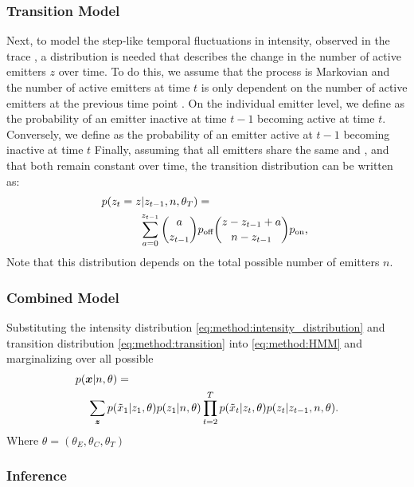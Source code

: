\subsubsection{Transition Model}
Next, to model the step-like temporal fluctuations in intensity, observed in the trace \trace, 
  a distribution is needed that describes the change in the number of active emitters $z$ over time. 
  To do this, we assume that the process is Markovian and the number of active emitters  
  at time $t$ is only dependent on the number of active emitters at the previous time point .
  On the individual emitter level, we define \pon as the probability of an emitter inactive at time $t-1$ becoming active at time $t$. 
  Conversely,  we define \poff as the probability of an emitter active at $t-1$ becoming inactive at time $t$ 
  Finally, assuming that all emitters share the same \pon and \poff, and that both remain constant over time, 
  the transition distribution can be written as:
  \begin{align}
    \label{eq:method:transition}
    p(z_{t} = z | z_{t-1}, n, \theta_{T}) &=\\
    \sum_{a = 0}^{z_{t-1}}
      {a \choose z_{t-1}}
      &\poff
      {z - z_{t-1} + a \choose \n - z_{t-1}}
      \pon
      \text{,} \notag\
  \end{align}
  Note that this distribution depends on the total possible number of  emitters $n$.

\subsubsection{Combined Model}

Substituting the intensity distribution \eqref{eq:method:intensity_distribution} 
and transition distribution \eqref{eq:method:transition} 
into \eqref{eq:method:HMM} and marginalizing over all possible \states
% 
\begin{align}
  \label{eq:method:likelihood}
  p(\bm{x}|n,\theta) &=\\
    \sum_{\bm{z}}
      p(&\tilde{x}_{1}|z_{1}, \theta)
      p(z_{1}|n, \theta)
      \prod_{t=2}^{T}
        p(\tilde{x}_{t}|z_{t}, \theta)
        p(z_{t}|z_{t-1},n, \theta)
    \notag
  \text{.}
\end{align}
%
Where $\theta = (\theta_{E}, \theta_{C}, \theta_{T})$

\subsubsection{Inference}

